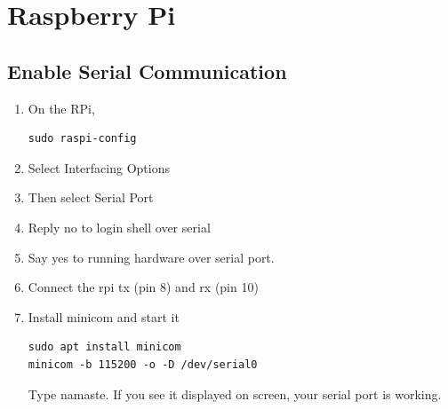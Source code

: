\documentclass[journal,12pt,twocolumn]{IEEEtran}
\renewcommand\thesection{\arabic{section}}
\renewcommand\thesubsection{\thesection.\arabic{subsection}}
\begin{document}
\section{Raspberry Pi}
\subsection{Enable Serial Communication}
\renewcommand{\theequation}{\theenumi}
\renewcommand{\thefigure}{\theenumi}
\begin{enumerate}[label=\thesubsection.\arabic*.,ref=\thesubsection.\theenumi]
\item On the RPi, 
\begin{lstlisting}
sudo raspi-config
\end{lstlisting}
\item Select Interfacing Options
\item Then select Serial Port
\item Reply no to login shell over serial
\item Say yes to running hardware over serial port.
\item Connect the rpi tx (pin 8) and rx (pin 10)
\item Install minicom and start it
\begin{lstlisting}
sudo apt install minicom
minicom -b 115200 -o -D /dev/serial0
\end{lstlisting}
Type namaste.  If you see it displayed on screen, your serial port is working.
\end{enumerate}
\end{document}
